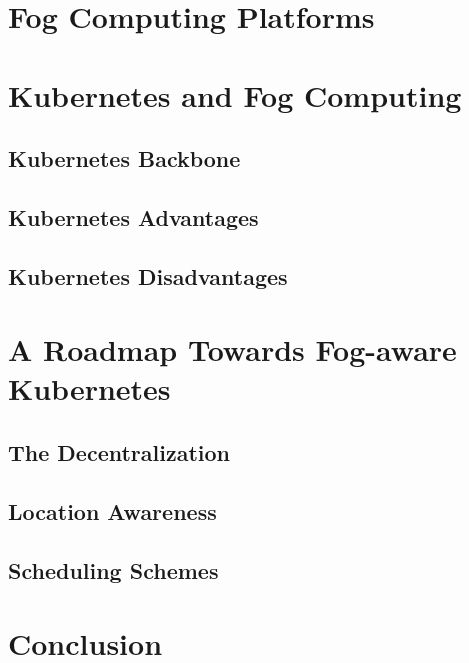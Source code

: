 \documentclass[letterpaper,twocolumn,10pt]{article}
\begin{document}
\section{Fog Computing Platforms}
\lipsum[20]
\section{Kubernetes and Fog Computing}

\subsection{Kubernetes Backbone}
\subsection{Kubernetes Advantages}
\subsection{Kubernetes Disadvantages}



\section{A Roadmap Towards Fog-aware Kubernetes}

\subsection{The Decentralization}
\subsection{Location Awareness}
\subsection{Scheduling Schemes}

\section{Conclusion}
\end{document}
